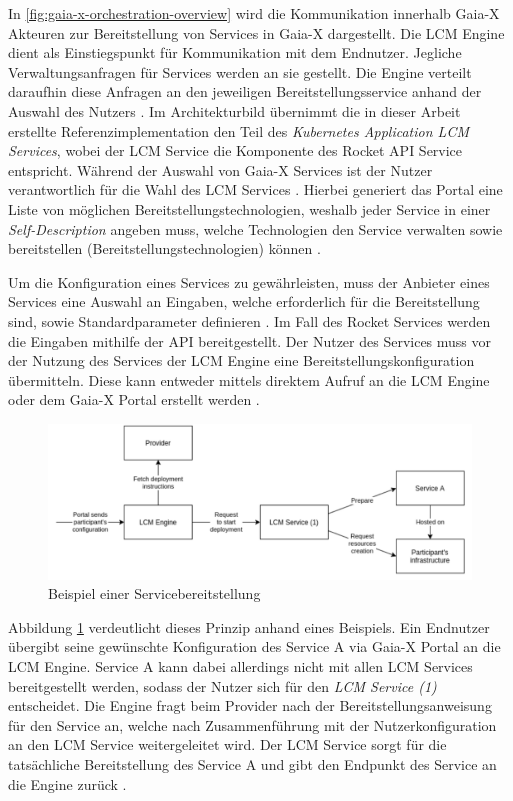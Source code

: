 In \ref{fig:gaia-x-orchestration-overview} wird die Kommunikation innerhalb Gaia-X Akteuren
zur Bereitstellung von Services in Gaia-X dargestellt.
Die \ac{LCM} Engine dient als Einstiegspunkt für Kommunikation mit dem Endnutzer. 
Jegliche Verwaltungsanfragen für Services werden an sie gestellt.
 Die Engine verteilt daraufhin diese Anfragen
an den jeweiligen Bereitstellungsservice anhand der Auswahl des Nutzers \cite{ORC2021}.
Im Architekturbild übernimmt die in dieser Arbeit erstellte Referenzimplementation
den Teil des \emph{Kubernetes Application LCM Services}, wobei der \ac{LCM} Service die
Komponente des Rocket API Service entspricht.
Während der Auswahl von Gaia-X Services ist der Nutzer verantwortlich für die Wahl des \ac{LCM} Services \cite{ORC2021}.
Hierbei generiert das Portal eine Liste von möglichen Bereitstellungstechnologien,
weshalb jeder Service in einer \emph{Self-Description} angeben muss, welche Technologien den Service
verwalten sowie bereitstellen (Bereitstellungstechnologien) können \cite{ORC2021}.

Um die Konfiguration eines Services zu gewährleisten, muss der Anbieter eines Services eine Auswahl
an Eingaben, welche erforderlich für die Bereitstellung sind, sowie Standardparameter definieren \cite{ORC2021}.
Im Fall des Rocket Services werden die Eingaben mithilfe der API bereitgestellt.
Der Nutzer des Services muss vor der Nutzung des Services der \ac{LCM} Engine eine Bereitstellungskonfiguration übermitteln.
Diese kann entweder mittels direktem Aufruf an die \ac{LCM} Engine oder dem Gaia-X Portal erstellt werden \cite{ORC2021}.

\begin{figure}[h]
  \centering
  \includegraphics[width=\textwidth]{gfx/chapters/4_gaia-X/example_deployment.png}
  \caption{Beispiel einer Servicebereitstellung}
  \label{fig:gaia-x-example_deployment}
\end{figure}
Abbildung \ref{fig:gaia-x-example_deployment} verdeutlicht dieses Prinzip anhand eines Beispiels.
Ein Endnutzer übergibt seine gewünschte Konfiguration des Service A via Gaia-X Portal an die \ac{LCM} Engine.
Service A kann dabei allerdings nicht mit allen LCM Services bereitgestellt werden,
sodass der Nutzer sich für den \emph{\ac{LCM} Service (1)} entscheidet.
Die Engine fragt beim Provider nach der Bereitstellungsanweisung für den Service an,
welche nach Zusammenführung mit der Nutzerkonfiguration an den \ac{LCM} Service weitergeleitet wird.
Der \ac{LCM} Service sorgt für die tatsächliche Bereitstellung des Service A
und gibt den Endpunkt des Service an die Engine zurück \cite{ORC2021}.


